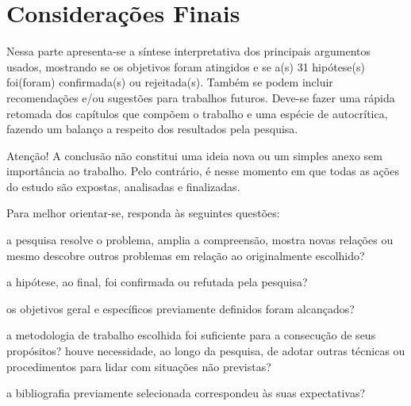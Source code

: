 \chapter{Considerações Finais}
    
    Nessa parte apresenta-se a síntese interpretativa dos principais argumentos usados, mostrando se os objetivos foram atingidos e se a(s) 31 hipótese(s) foi(foram) confirmada(s) ou rejeitada(s). Também se podem incluir recomendações e/ou sugestões para trabalhos futuros. Deve-se fazer uma rápida retomada dos capítulos que compõem o trabalho e uma espécie de autocrítica, fazendo um balanço a respeito dos resultados pela pesquisa.
    
    Atenção! A conclusão não constitui uma ideia nova ou um simples anexo sem importância ao trabalho. Pelo contrário, é nesse momento em que todas as ações do estudo são expostas, analisadas e finalizadas.
    
    Para melhor orientar-se, responda às seguintes questões:
    
    \begin{alineas}
	    \item a pesquisa resolve o problema, amplia a compreensão, mostra novas relações ou mesmo descobre outros problemas em relação ao originalmente escolhido?
	    \item a hipótese, ao final, foi confirmada ou refutada pela pesquisa?
	    \item os objetivos geral e específicos previamente definidos foram alcançados?
	    \item a metodologia de trabalho escolhida foi suficiente para a consecução de seus propósitos? houve necessidade, ao longo da pesquisa, de adotar outras técnicas ou procedimentos para lidar com situações não previstas?
	    \item a bibliografia previamente selecionada correspondeu às suas expectativas?
	\end{alineas}
    